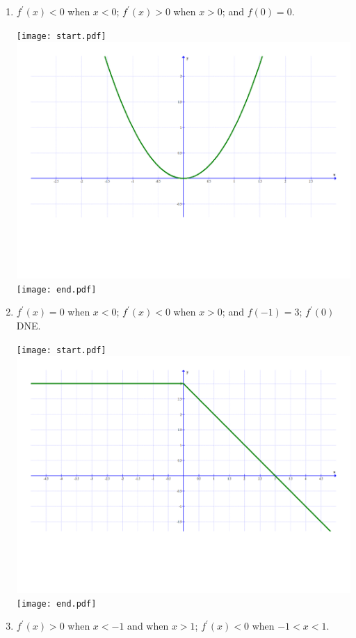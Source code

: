 \documentclass[12pt]{article}
\begin{document}
\begin{enumerate}
\begin{enumerate}

\item $f^{\prime}(x) <0$ when $x<0$; $f^{\prime}(x) >0$ when $x>0$; and $f(0) = 0$.

\texttt{[image: start.pdf]}
{{\includegraphics[scale=0.35]{graph1.pdf}}}
\texttt{[image: end.pdf]}


\item $f^{\prime}(x) = 0$ when $x<0$; $f^{\prime}(x) <0$ when $x>0$; and $f(-1) = 3$; $f^{\prime}(0)$ DNE.

\texttt{[image: start.pdf]}
{{\includegraphics[scale=0.35]{graph2.pdf}}}
\texttt{[image: end.pdf]}


\item $f^{\prime}(x) >0$ when $x<-1$ and when $x>1$; $f^{\prime}(x) < 0$ when $-1<x<1$.  


\end{enumerate}
\end{enumerate}
\end{document}
